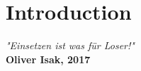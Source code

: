 \chapter{Introduction}
\begin{flushright}
\textit{"Einsetzen ist was f\"ur Loser!"} \\
\textbf{Oliver Isak, 2017}
\end{flushright}
\Blindtext